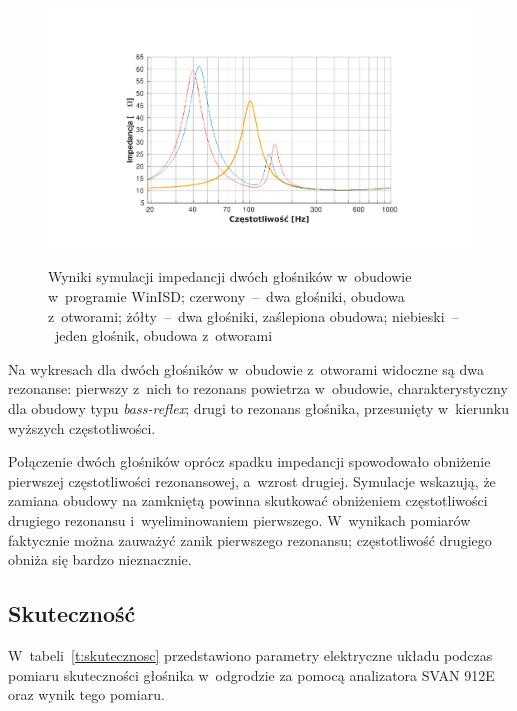 \documentclass[12pt]{oska}
\begin{document}
	\begin{figure}[!ht]
		\centering
		\includegraphics[width=.8\textwidth,trim={5.1cm 1.5cm 4.7cm 3cm},clip]{winisd_osie.pdf}\\
		\setlength{\unitlength}{1mm}
		\caption{Wyniki symulacji impedancji dwóch głośników w~obudowie w~programie WinISD; \color{BrickRed}czerwony\color{Black}~--~dwa głośniki, obudowa z~otworami; \color{Dandelion}żółty\color{Black}~--~dwa głośniki, zaślepiona obudowa; \color{RoyalBlue}niebieski\color{Black}~--~jeden głośnik, obudowa z~otworami}
		\label{r:winisd}
	\end{figure}
	
	Na wykresach dla dwóch głośników w~obudowie z~otworami widoczne są dwa rezonanse: pierwszy z~nich to rezonans powietrza w~obudowie, charakterystyczny dla obudowy typu \textit{bass-reflex}; drugi to rezonans głośnika, przesunięty w~kierunku wyższych częstotliwości.
	
	Połączenie dwóch głośników oprócz spadku impedancji spowodowało obniżenie pierwszej częstotliwości rezonansowej, a~wzrost drugiej.  Symulacje wskazują, że zamiana obudowy na zamkniętą powinna skutkować obniżeniem częstotliwości drugiego rezonansu i~wyeliminowaniem pierwszego. W~wynikach pomiarów faktycznie można zauważyć zanik pierwszego rezonansu; częstotliwość drugiego obniża się bardzo nieznacznie.
	
	
	\subsection{Skuteczność}
	
	W~tabeli~\ref{t:skutecznosc} przedstawiono parametry elektryczne układu podczas pomiaru skuteczności głośnika w~odgrodzie za pomocą analizatora SVAN 912E oraz wynik tego pomiaru.
	
\end{document}
